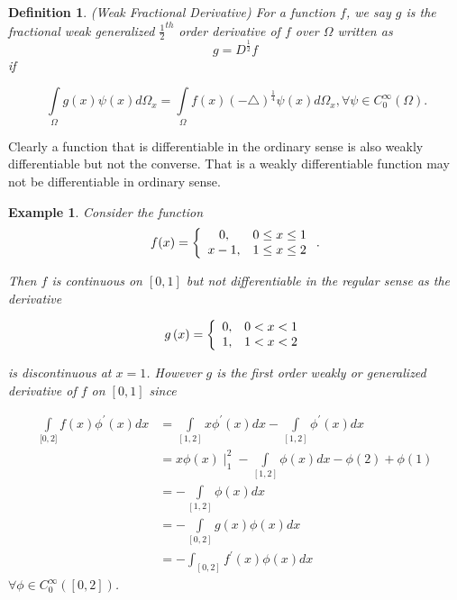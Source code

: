 \documentclass{amsart}%
\theoremstyle{plain}
\newtheorem{definition}{Definition}
\newtheorem{example}{Example}
\numberwithin{equation}{section}
\begin{document}
\begin{definition}
(Weak Fractional Derivative) For a function $f$, we say $g$ is the fractional
weak generalized $\frac{1}{2}^{th}$ order derivative of $f$ over $\Omega$
written as
\[
g=D^{\frac{1}{2}}f
\]
if%

\[
\
{\displaystyle\int\limits_{\Omega}}
g(x)\psi(x)d\Omega_{x}=%
{\displaystyle\int\limits_{\Omega}}
f(x)\left(  -\triangle\right)  ^{\frac{1}{4}}\psi(x)d\Omega_{x},\forall\psi\in
C_{0}^{\infty}\left(  \Omega\right)  \text{.}%
\]

\end{definition}

Clearly a function that is differentiable in the ordinary sense is also weakly
differentiable but not the converse. That is a weakly differentiable function
may not be differentiable in ordinary sense.

\begin{example}
Consider the function%
\[
f(x)=\left\{
\begin{array}
[c]{cc}%
0, & 0\leq x\leq1\\
x-1, & 1\leq x\leq2
\end{array}
\right.  .
\]


Then $f$ is continuous on $[0,1]$ but not differentiable in the regular sense
as the derivative%

\[
g\left(  x\right)  =\left\{
\begin{array}
[c]{cc}%
0, & 0<x<1\\
1, & 1<x<2
\end{array}
\right.
\]


is discontinuous at $x=1$. However $g$ is the first order weakly or
generalized derivative of $f$ on $[0,1]$ since%

\begin{align*}%
{\displaystyle\int\limits_{\lbrack0,2]}}
f(x)\phi^{\prime}(x)dx  & =%
{\displaystyle\int\limits_{[1,2]}}
x\phi^{\prime}(x)dx-%
{\displaystyle\int\limits_{[1,2]}}
\phi^{\prime}(x)dx\\
& =x\phi\left(  x\right)  \mid_{1}^{2}-%
{\displaystyle\int\limits_{[1,2]}}
\phi(x)dx-\phi\left(  2\right)  +\phi\left(  1\right) \\
& =-%
{\displaystyle\int\limits_{[1,2]}}
\phi(x)dx\\
& =-%
{\displaystyle\int\limits_{[0,2]}}
g(x)\phi(x)dx\\
& =-\int_{[0,2]}f^{\prime}(x)\phi(x)dx
\end{align*}
$\forall\phi\in C_{0}^{\infty}\left(  [0,2]\right)  $.
\end{example}
\end{document}
